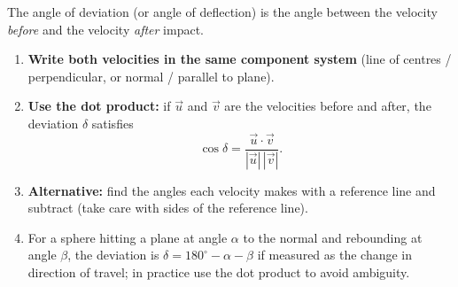 \documentclass[11pt]{article}
\newcommand{\cle}[1]{{\popxbold\color{popdark}#1}}
\begin{document}
\begin{methode}
The \cle{angle of deviation} (or angle of deflection) is the angle between the velocity \emph{before} and the velocity \emph{after} impact.
\begin{enumerate}
\item \textbf{Write both velocities in the same component system} (line of centres / perpendicular, or normal / parallel to plane).
\item \textbf{Use the dot product:} if $\vec{u}$ and $\vec{v}$ are the velocities before and after, the deviation $\delta$ satisfies
\[ \cos\delta = \frac{\vec{u}\cdot\vec{v}}{|\vec{u}|\,|\vec{v}|}. \]
\item \textbf{Alternative:} find the angles each velocity makes with a reference line and subtract (take care with sides of the reference line).
\item For a sphere hitting a plane at angle $\alpha$ to the normal and rebounding at angle $\beta$, the deviation is $\delta = 180^{\circ} - \alpha - \beta$ if measured as the change in direction of travel; in practice use the dot product to avoid ambiguity.
\end{enumerate}
\end{methode}
\end{document}
